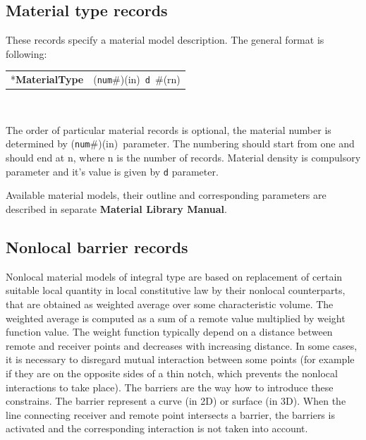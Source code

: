 \documentclass[a4paper]{article}
\makeatletter
\newcommand{\param}[1]{\texttt{#1}} %
\newcommand{\field}[2]{\param{#1}~\#{\tiny(#2)}} %
\newcommand{\componentNum}{(\param{num}\#){\tiny(in)}} %
\newcommand{\entKeyword}[1]{*\textbf{#1}} %
\newenvironment{record}[1][]{\begin{tabular}{|ll}}{\end{tabular}\\}
\newcommand{\recentry}[2]{{#1}&{#2}\\}
\newcounter{rcc}
\newenvironment{record}[1][\textwidth]{\setcounter{rcc}{0}\begin{tabular*}{#1}{|ll@{\extracolsep{\fill}}r}}{\end{tabular*}\\}
\newcommand{\recentry}[2]{\ifthenelse{\value{rcc}>0}{&$\backslash$ \\}{\setcounter{rcc}{1}}{#1}&{#2}}
\makeatother
\begin{document}
\subsection{Material type  records}
\label{_MaterialTypeRecords}
These records specify a material model  description. The general format is
following:

\noindent
\begin{record}
  \recentry{\entKeyword{MaterialType}}{\componentNum\ \field{d}{rn}}
\end{record}

The order of particular material records is optional, the material number is determined by \componentNum\ parameter.
The numbering should start from one and should end at n, where n is the number of records.
Material density is compulsory parameter and it's value is given by
\param{d} parameter.

Available material models, their outline and
corresponding parameters are described in separate \textbf{Material Library Manual}.

\subsection{Nonlocal barrier records}
\label{_NonlocalBarrierRecords}
Nonlocal material models of integral type are based on replacement of
certain suitable local quantity in local constitutive law by their
nonlocal counterparts, that are obtained as weighted average over
some characteristic volume. The weighted average is computed as a sum
of a remote value multiplied by weight function value. The weight
function typically depend on a distance between remote and receiver
points and decreases with increasing distance. In some cases, it is
necessary to disregard mutual interaction between some points (for
example if they are on the opposite sides of a thin notch, which
prevents the nonlocal interactions to take place). The barriers are
the way how to introduce these constrains. The barrier represent a
curve (in 2D) or surface (in 3D). When the line connecting receiver and
remote point intersects a barrier, the barriers is activated and the
corresponding interaction is not taken into account.
\end{document}

